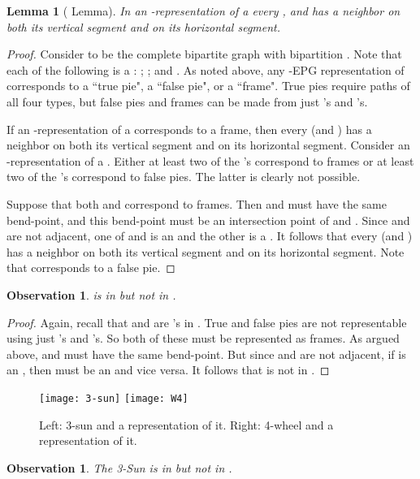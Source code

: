 \documentclass[11pt,3p,times]{elsarticle}
\newenvironment{myproof}{\begin{proof}}{\end{proof}}
\newtheorem{observation}[theorem]{Observation}
\newtheorem{lemma}[theorem]{Lemma}
\begin{document}
\begin{lemma}[ Lemma]\label{lem:K2,3}
In an -representation of a  every , and  has a neighbor on both its vertical segment and on its horizontal segment.
\end{lemma}
\begin{myproof}
Consider 
to be the complete bipartite graph with bipartition 
. Note that each of the following is a :
; ; and . As noted above, any
-EPG representation of  corresponds to  a ``true pie", a
``false pie", or a ``frame".  True pies require paths of all four
types, but false pies and frames can be made from just 's and
's.









If an -representation of a  corresponds to a
frame, then every  (and ) has a neighbor on both
its vertical segment and on its horizontal segment. Consider an
-representation of a . Either at least two of the 's
correspond to frames or at least two of the 's correspond to false pies.
The latter is clearly not possible.

Suppose that both   and 
correspond to frames.  Then  and  must have the same
bend-point, and this bend-point must be an  intersection point of
 and . Since  and  are not adjacent, one of 
and  is an  and the other is a . It follows that
every  (and ) has a neighbor on both its vertical
segment and on its horizontal segment. Note that  corresponds
to a false pie.
\end{myproof}
\begin{observation}\label{obs:K2,3}
 is in  but not in . 
\end{observation}
\begin{myproof}
Again, recall
that  and  are 's in . True and
false pies are not representable using just 's and 's.  So
both of these must be represented as frames.  As argued above,
 and  must have the same bend-point.  But since  and
 are not adjacent, if  is an , then  must be an
 and vice versa. It follows that  is not in
.
\end{myproof}
\begin{figure}[bth]
\hfill
\texttt{[image: 3-sun]}
\hfill
\texttt{[image: W4]}
 \hfill \ \caption{Left: 3-sun and a
representation of it. Right: 4-wheel and a
representation of it.}\label{fig:3-sun-and4-wheel}
\end{figure}
\begin{observation}\label{obs:3-sun}
The 3-Sun is in  but not in .
\end{observation}
\end{document}
